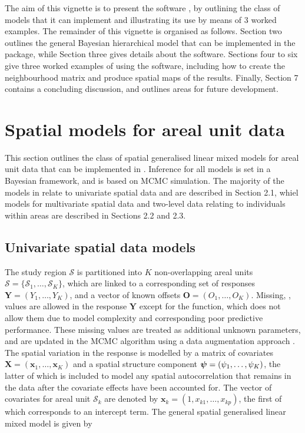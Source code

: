 \documentclass[article,shortnames,nojss]{jss}
\newcommand{\bd}[1]{\ensuremath{\mbox{\boldmath $#1$}}}
\begin{document}
\hspace{1cm} The aim of this vignette is to present the software , by outlining the class of models that it can implement and illustrating its use by means of 3 worked examples. The remainder of this vignette is organised as follows. Section two outlines the general Bayesian hierarchical model that can be implemented in the  package, while Section three gives details about the software.  Sections four to six give three worked examples of using the software, including how to create the neighbourhood matrix and produce spatial maps of the results. Finally, Section 7 contains a concluding discussion, and outlines areas for future development.


\section{Spatial models for areal unit data}
This section outlines the class of spatial generalised linear mixed models for areal unit data that can be implemented in . Inference for all models is set in a Bayesian framework, and is based on MCMC simulation. The majority of the models in  relate to univariate spatial data and are described in Section 2.1, whiel models for multivariate spatial data and two-level data relating to individuals within areas are described in Sections 2.2 and 2.3.


\subsection{Univariate spatial data models}
The study region $\mathcal{S}$ is partitioned into $K$ non-overlapping areal units $\mathcal{S}=\{\mathcal{S}_{1},\ldots,\mathcal{S}_{K}\}$, which are linked to a corresponding set of responses $\mathbf{Y}=(Y_{1},\ldots,Y_{K})$, and a vector of known offsets $\mathbf{O}=(O_{1},\ldots,O_{K})$. Missing, , values are allowed in the response $\mathbf{Y}$ except for the  function, which does not allow them due to model complexity and corresponding poor predictive performance. These missing values are treated as additional unknown parameters, and are updated in the MCMC algorithm using a data augmentation approach \cite{tanner1987}. The spatial variation in the response is modelled by a matrix of covariates $\mathbf{X}=(\mathbf{x}_{1},\ldots,\mathbf{x}_{K})$ and  a spatial structure component $\bd{\psi}=(\psi_{1},\ldots,\psi_{K})$, the latter of which is included to model any spatial autocorrelation that remains in the data after the covariate effects have been accounted for. The vector of covariates for areal unit $\mathcal{S}_{k}$ are denoted by $\mathbf{x}_{k}=(1, x_{k1},\ldots,x_{kp})$, the first of which corresponds to an intercept term. The general spatial generalised linear mixed model is given by
\end{document}
